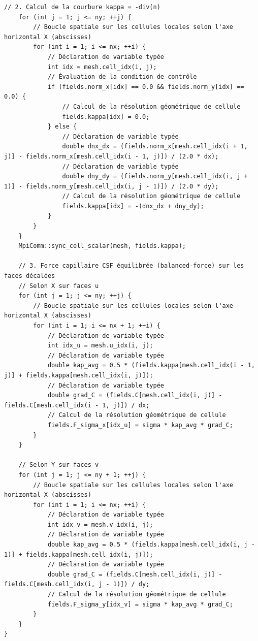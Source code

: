 \documentclass[10pt,a4paper,oneside]{book}
\begin{document}
\begin{lstlisting}[language={[11]C++}]
    // 2. Calcul de la courbure kappa = -div(n)
    for (int j = 1; j <= ny; ++j) {
        // Boucle spatiale sur les cellules locales selon l'axe horizontal X (abscisses)
        for (int i = 1; i <= nx; ++i) {
            // Déclaration de variable typée
            int idx = mesh.cell_idx(i, j);
            // Évaluation de la condition de contrôle
            if (fields.norm_x[idx] == 0.0 && fields.norm_y[idx] == 0.0) {
                // Calcul de la résolution géométrique de cellule
                fields.kappa[idx] = 0.0;
            } else {
                // Déclaration de variable typée
                double dnx_dx = (fields.norm_x[mesh.cell_idx(i + 1, j)] - fields.norm_x[mesh.cell_idx(i - 1, j)]) / (2.0 * dx);
                // Déclaration de variable typée
                double dny_dy = (fields.norm_y[mesh.cell_idx(i, j + 1)] - fields.norm_y[mesh.cell_idx(i, j - 1)]) / (2.0 * dy);
                // Calcul de la résolution géométrique de cellule
                fields.kappa[idx] = -(dnx_dx + dny_dy);
            }
        }
    }
    MpiComm::sync_cell_scalar(mesh, fields.kappa);

    // 3. Force capillaire CSF équilibrée (balanced-force) sur les faces décalées
    // Selon X sur faces u
    for (int j = 1; j <= ny; ++j) {
        // Boucle spatiale sur les cellules locales selon l'axe horizontal X (abscisses)
        for (int i = 1; i <= nx + 1; ++i) {
            // Déclaration de variable typée
            int idx_u = mesh.u_idx(i, j);
            // Déclaration de variable typée
            double kap_avg = 0.5 * (fields.kappa[mesh.cell_idx(i - 1, j)] + fields.kappa[mesh.cell_idx(i, j)]);
            // Déclaration de variable typée
            double grad_C = (fields.C[mesh.cell_idx(i, j)] - fields.C[mesh.cell_idx(i - 1, j)]) / dx;
            // Calcul de la résolution géométrique de cellule
            fields.F_sigma_x[idx_u] = sigma * kap_avg * grad_C;
        }
    }

    // Selon Y sur faces v
    for (int j = 1; j <= ny + 1; ++j) {
        // Boucle spatiale sur les cellules locales selon l'axe horizontal X (abscisses)
        for (int i = 1; i <= nx; ++i) {
            // Déclaration de variable typée
            int idx_v = mesh.v_idx(i, j);
            // Déclaration de variable typée
            double kap_avg = 0.5 * (fields.kappa[mesh.cell_idx(i, j - 1)] + fields.kappa[mesh.cell_idx(i, j)]);
            // Déclaration de variable typée
            double grad_C = (fields.C[mesh.cell_idx(i, j)] - fields.C[mesh.cell_idx(i, j - 1)]) / dy;
            // Calcul de la résolution géométrique de cellule
            fields.F_sigma_y[idx_v] = sigma * kap_avg * grad_C;
        }
    }
}


\end{lstlisting}
\end{document}
